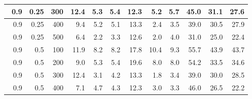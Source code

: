 \begin{longtable}{|r|r|r|r|r|r|r|r|r|r|r|r|}
    \hline \
    0.9                            & 0.25                    & 300                       & 12.4                       & 5.3                       & 5.4                       & 12.3                      & 5.2                       & 5.7                       & 45.0                      & 31.1                      & 27.6                      \\
    \hline \
    0.9                            & 0.25                     & 400                       & 9.4                      & 5.2                       & 5.1                       & 13.3                      & 2.4                      & 3.5                       & 39.0                      & 30.5                      & 27.9                      \\
    \hline \
    0.9                            & 0.25                     & 500                       & 6.4                       & 2.2                       & 3.3                       & 12.6                      & 2.0                       & 4.0                       & 31.0                      & 25.0                      & 22.4                      \\
    \hline \
    0.9                            & 0.5                     & 100                       & 11.9                      & 8.2                       & 8.2                       & 17.8                      & 10.4                       & 9.3                       & 55.7                      & 43.9                      & 43.7                      \\
    \hline \
    0.9                            & 0.5                     & 200                       & 9.0                       & 5.3                       & 5.4                       & 19.6                      & 8.0                       & 8.0                       & 54.2                      & 33.5                      & 34.6                      \\
    \hline \
    0.9                            & 0.5                     & 300                       & 12.4                       & 3.1                       & 4.2                       & 13.3                       & 1.8                       & 3.4                       & 39.0                      & 30.0                      & 28.5                      \\
    \hline \
    0.9                            & 0.5                    & 400                       & 7.1                      & 4.7                       & 4.3                       & 12.3                      & 3.0                      & 3.3                      & 46.0                      & 26.5                      & 22.2                      \\

\end{longtable}
